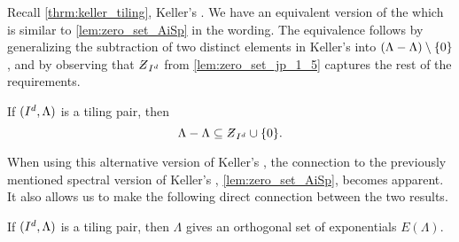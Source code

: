 \documentclass[../thesis.tex]{subfiles}
\begin{document}
  





Recall \cref{thrm:keller_tiling}, Keller's . We have an equivalent version of the  which is similar to \cref{lem:zero_set_AiSp} in the wording. The equivalence follows by generalizing the subtraction of two distinct elements in Keller's  into $(\Lambda-\Lambda)\setminus\{0\}$, and by observing that $\Zstroke_{I^d}$ from \cref{lem:zero_set_jp_1_5} captures the rest of the requirements.
\begin{theorem}\label{thrm:keller_alternative}
    If $(I^d,\Lambda)$ is a tiling pair, then 
    \begin{equation*}
        \Lambda - \Lambda \subseteq \Zstroke_{I^d} \cup \braq{0}.
    \end{equation*} 
\end{theorem}
When using this alternative version of Keller's , the connection to the previously mentioned spectral version of Keller's  , \cref{lem:zero_set_AiSp}, becomes apparent. It also allows us to make the following direct connection between the two results. 
\begin{corollary}\label{cor:tiling_pair_implies_orthogonal}
    If $(I^d, \Lambda)$ is a tiling pair, then $\Lambda$ gives an orthogonal set of exponentials $E(\Lambda)$.
\end{corollary}
\end{document}
